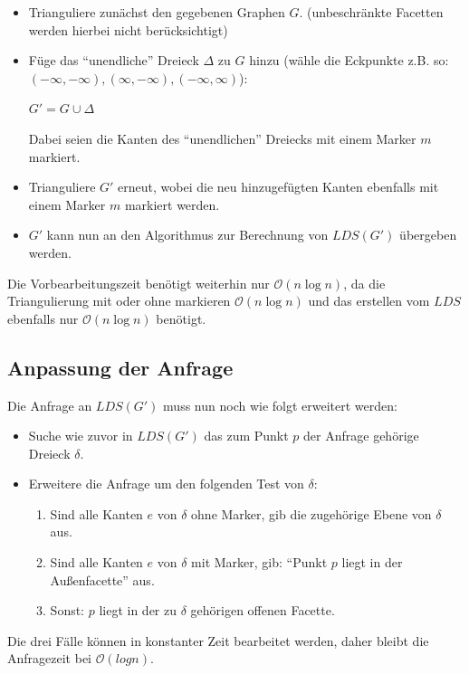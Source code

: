 \documentclass[a4paper]{article}
\begin{document}
\begin{itemize}
 \item Trianguliere zunächst den gegebenen Graphen $G$. (unbeschränkte Facetten werden hierbei nicht berücksichtigt)
 \item Füge das "`unendliche"' Dreieck $\Delta$ zu $G$ hinzu (wähle die Eckpunkte z.B. so: $(-\infty,-\infty), (\infty,-\infty), (-\infty,\infty) $):
  
       $G' = G \cup \Delta$
       
       Dabei seien die Kanten des "`unendlichen"' Dreiecks mit einem Marker $m$ markiert. 
 
 \item Trianguliere $G'$ erneut, wobei die neu hinzugefügten Kanten ebenfalls mit einem Marker $m$ markiert werden.  
 \item $G'$ kann nun an den Algorithmus zur Berechnung von $LDS(G')$ übergeben werden.
\end{itemize}

Die Vorbearbeitungszeit benötigt weiterhin nur $\mathcal{O}(n \log n)$, da die Triangulierung mit oder ohne markieren $\mathcal{O}(n \log n)$ und das erstellen vom $LDS$ ebenfalls nur $\mathcal{O}(n \log n)$ benötigt.


\subsection*{Anpassung der Anfrage}
Die Anfrage an $LDS(G')$ muss nun noch wie folgt erweitert werden:

\begin{itemize}
 \item Suche wie zuvor in $LDS(G')$ das zum Punkt $p$ der Anfrage gehörige Dreieck $\delta$.
 \item Erweitere die Anfrage um den folgenden Test von $\delta$:
 \begin{enumerate}
  \item Sind alle Kanten $e$ von $\delta$ ohne Marker, gib die zugehörige Ebene von $\delta$ aus.
  \item Sind alle Kanten $e$ von $\delta$ mit Marker, gib: "`Punkt $p$ liegt in der Außenfacette"' aus.
  \item Sonst: $p$ liegt in der zu $\delta$ gehörigen offenen Facette.
 \end{enumerate}

\end{itemize}

Die drei Fälle können in konstanter Zeit bearbeitet werden, daher bleibt die Anfragezeit bei $\mathcal{O}(log n)$.
\end{document}
